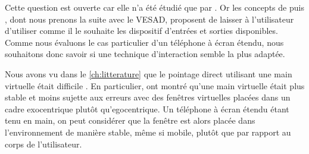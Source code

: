 Cette question est ouverte car elle n'a été étudié que par \cite{Grubert2015}. Or les concepts de \cite{Serrano2015} puis \cite{Serrano2015a}, dont nous prenons la suite avec le VESAD, proposent de laisser à l'utilisateur d'utiliser comme il le souhaite les dispositif d'entrées et sorties disponibles. Comme nous évaluons le cas particulier d'un téléphone à écran étendu, nous souhaitons donc savoir si une technique d'interaction semble la plus adaptée.

Nous avons vu dans le \autoref{ch:litterature} que le pointage direct utilisant une main virtuelle était difficile \citep{Chan2010, Argelaguet2013}. En particulier, \cite{Ens2014} ont montré qu'une main virtuelle était plus stable et moins sujette aux erreurs avec des fenêtres virtuelles placées dans un cadre exocentrique plutôt qu'egocentrique. Un téléphone à écran étendu étant tenu en main, on peut considérer que la fenêtre est alors placée dans l'environnement de manière stable, même si mobile, plutôt que par rapport au corps de l'utilisateur.


